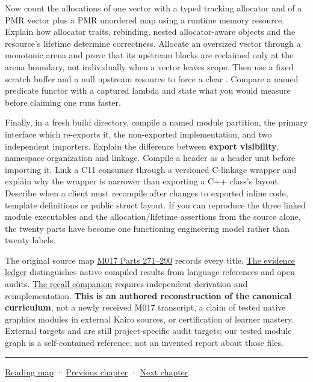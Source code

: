 Now count the allocations of one vector with a typed tracking allocator and of a PMR vector plus a PMR unordered map using a runtime memory resource. Explain how allocator traits, rebinding, nested allocator-aware objects and the resource's lifetime determine correctness. Allocate an oversized vector through a monotonic arena and prove that its upstream blocks are reclaimed only at the arena boundary, not individually when a vector leaves scope. Then use a fixed scratch buffer and a null upstream resource to force a clear . Compare a named predicate functor with a captured lambda and state what you would measure before claiming one runs faster.

Finally, in a fresh build directory, compile a named module partition, the primary interface which re-exports it, the non-exported implementation, and two independent importers. Explain the difference between \textbf{export visibility}, namespace organization and linkage. Compile a header as a header unit before importing it. Link a C11 consumer through a versioned C-linkage wrapper and explain why the wrapper is narrower than exporting a C++ class's layout. Describe when a client must recompile after changes to exported inline code, template definitions or public struct layout. If you can reproduce the three linked module executables and the allocation/lifetime assertions from the source alone, the twenty parts have become one functioning engineering model rather than twenty labels.

The original source map \hyperref[appendix-fd090d982a15-m017-parts-271290-lazy-asset-queries-allocation-lifetimes-and-compiled-api-boundaries]{M017 Parts 271--290} records every title. \hyperref[appendix-a103e7846d21-phase-7-additive-reconstruction-m017-parts-271290]{The evidence ledger} distinguishes native compiled results from language references and open audits. \hyperref[appendix-960160274237-from-borrowed-reports-to-module-boundaries-m017-reconstruction]{The recall companion} requires independent derivation and reimplementation. \textbf{This is an authored reconstruction of the canonical curriculum}, not a newly received M017 transcript, a claim of tested native graphics modules in external Kairo sources, or certification of learner mastery. External targets  and  are still project-specific audit targets; our tested module graph is a self-contained reference, not an invented report about those files.

\begin{center}\rule{0.5\linewidth}{0.5pt}\end{center}

\hyperref[volume-reading-map]{Reading map} · \hyperref[05-engine-i-ch005-generic-asset-pipelines-with-stable-identity]{Previous chapter} · \hyperref[05-engine-i-ch007-typed-apis-and-measured-cpu-data-structures]{Next chapter}
